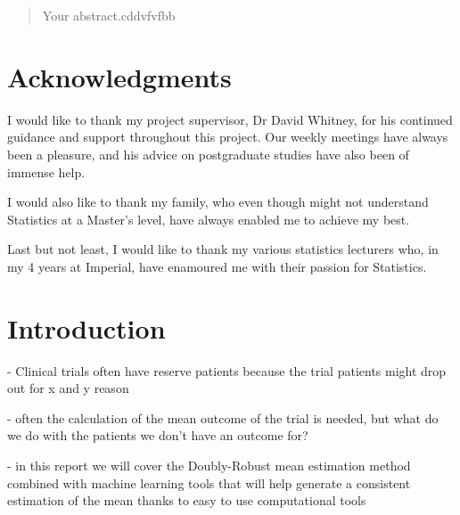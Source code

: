\documentclass[12pt,twoside]{article}
\date{October 2020}
\begin{document}



\clearpage{\pagestyle{empty}\cleardoublepage}
\setcounter{page}{1}
\pagestyle{fancy}
\setlength{\parindent}{5ex}
\begin{abstract}
Your abstract.cddvfvfbb


\end{abstract}

\cleardoublepage
\section*{Acknowledgments}
I would like to thank my project supervisor, Dr David Whitney, for his continued guidance and support throughout this project. Our weekly meetings have always been a pleasure, and his advice on postgraduate studies have also been of immense help. 

I would also like to thank my family, who even though might not understand Statistics at a Master's level, have always enabled me to achieve my best.

Last but not least, I would like to thank my various statistics lecturers who, in my 4 years at Imperial, have enamoured me with their passion for Statistics.

\clearpage{\pagestyle{empty}\cleardoublepage}

\tableofcontents 


\clearpage{\pagestyle{empty}\cleardoublepage}
\setcounter{page}{1}
\fancyhead[L]{\textsl{\leftmark}}

\section{Introduction} 

- Clinical trials often have reserve patients because the trial patients might drop out for x and y reason

- often the calculation of the mean outcome of the trial is needed, but what do we do with the patients we don't have an outcome for?

- in this report we will cover the Doubly-Robust mean estimation method combined with machine learning tools that will help generate a consistent estimation of the mean thanks to easy to use computational tools
\end{document}
